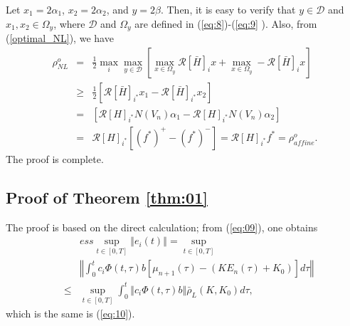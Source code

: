 \documentclass[letterpaper, 10 pt, conference]{ieeeconf}
\begin{document}
Let $x_{1}=2\alpha _{1}$, $x_{2}=2\alpha _{2}$, and $y=2\beta $. Then, it is
easy to verify that $y\in \mathcal{D}$ and $x_{1},x_{2}\in \Omega _{y}$,
where $\mathcal{D}$ and $\Omega _{y}$ are defined in (\ref{eq:8})-(\ref{eq:9}%
). Also, from (\ref{optimal_NL}), we have 
\begin{eqnarray*}
\rho _{NL}^{o} &=&\frac{1}{2}\max_{i}\max_{y\in \mathcal{D}}\left[
\max_{x\in \Omega _{y}}\mathcal{R}\left[ \bar{H}\right] _{i}x+\max_{x\in
\Omega _{y}}-\mathcal{R}\left[ \bar{H}\right] _{i}x\right] \\
&\geq &\frac{1}{2}\left[ \mathcal{R}\left[ \bar{H}\right] _{i^{\ast }}x_{1}-%
\mathcal{R}\left[ \bar{H}\right] _{i^{\ast }}x_{2}\right] \\
&=&\left[ \mathcal{R}\left[ H\right] _{i^{\ast }}N\left( V_{n}\right) \alpha
_{1}-\mathcal{R}\left[ H\right] _{i^{\ast }}N\left( V_{n}\right) \alpha _{2}%
\right] \\
&=&\mathcal{R}\left[ H\right] _{i^{\ast }}\left[ \left( f^{\ast }\right)
^{+}-\left( f^{\ast }\right) ^{-}\right] =\mathcal{R}\left[ H\right]
_{i^{\ast }}f^{\ast }=\rho _{affine}^{o}.
\end{eqnarray*}%
The proof is complete.

\subsection*{Proof of Theorem \protect\ref{thm:01}}

The proof is based on the direct calculation; from (\ref{eq:09}), one obtains%
\begin{eqnarray*}
&&ess\sup_{t\in \left[ 0,T\right] }\left\Vert e_{i}\left( t\right)
\right\Vert =\sup_{t\in \left[ 0,T\right] } \\
&&\left\Vert \int_{0}^{t}c_{i}\Phi \left( t,\tau \right) b\left[ \mu
_{n+1}\left( \tau \right) -\left( KE_{n}\left( \tau \right) +K_{0}\right) %
\right] d\tau \right\Vert \\
&\leq &\sup_{t\in \left[ 0,T\right] }\int_{0}^{t}\left\Vert c_{i}\Phi \left(
t,\tau \right) b\right\Vert \bar{\rho}_{L}\left( K,K_{0}\right) d\tau ,
\end{eqnarray*}%
which is the same is (\ref{eq:10}).



\end{document}
